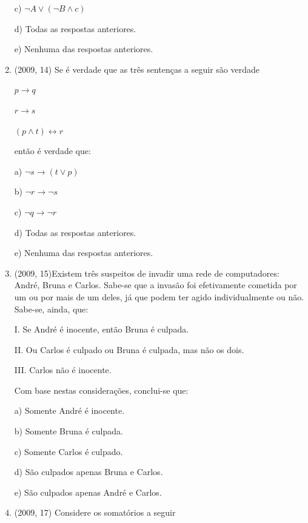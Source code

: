 \documentclass{article}
\begin{document}
\begin{enumerate}
c) $\lnot A \lor(\lnot B \land c)$

d) Todas as respostas anteriores.

e) Nenhuma das respostas anteriores.\newline





\item(2009, 14) Se é verdade que as três sentenças a seguir são verdade

$p \rightarrow q$

$r \rightarrow s$

$(p \land t ) \leftrightarrow r$

então é verdade que:

a) $\lnot s \rightarrow (t \lor p)$

b) $\lnot r \rightarrow \lnot s$

c) $\lnot q \rightarrow \lnot r$

d) Todas as respostas anteriores.

e) Nenhuma das respostas anteriores.\newline







\item(2009, 15)Existem três suspeitos de invadir uma rede de computadores: André, Bruna e Carlos.
Sabe-se que a invasão foi efetivamente cometida por um ou por mais de um deles, já
que podem ter agido individualmente ou não. Sabe-se, ainda, que:\newline

I. Se André é inocente, então Bruna é culpada.

II. Ou Carlos é culpado ou Bruna é culpada, mas não os dois.

III. Carlos não é inocente.\newline

Com base nestas considerações, conclui-se que:

a) Somente André é inocente.

b) Somente Bruna é culpada.

c) Somente Carlos é culpado.

d) São culpados apenas Bruna e Carlos.

e) São culpados apenas André e Carlos.\newline






\item(2009, 17) Considere os somatórios a seguir


\end{enumerate}
\end{document}

